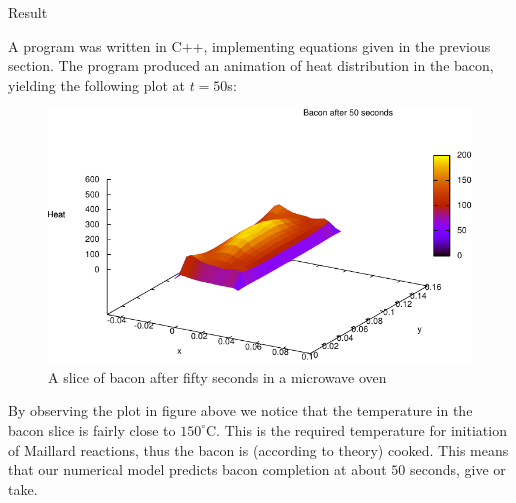 \documentclass[final,hyperref={pdfpagelabels=false}]{beamer}
\begin{document}
\begin{frame}
\begin{columns}[t]
\begin{column}{.97\textwidth}
\begin{multicols}{2}
\vspace{1.0\baselineskip}
{\Large Result}

A program was written in C++, implementing equations given in the previous
section. The program produced an animation of heat distribution in the bacon, 
yielding the following plot at $t = 50$s:
\begin{figure}[!h] 
  \begin{center}
    \includegraphics[width=\linewidth]{bacon-50sec.pdf}
  \end{center}
  \caption{A slice of bacon after fifty seconds in a microwave oven}
  \label{fig:bacon-50sec}
\end{figure}
By observing the plot in figure above we notice that the
temperature in the bacon slice is fairly close to $150^{\circ}$C. This is the required temperature
for initiation of Maillard reactions, thus the bacon is (according to theory)
cooked. This means that our numerical model predicts bacon completion at about
$50$ seconds, give or take.


\end{multicols}
\end{column}
\end{columns}
\end{frame}
\end{document}
